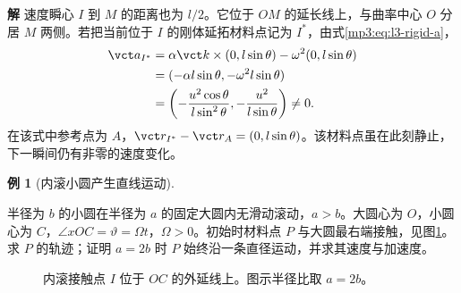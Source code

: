 \documentclass[11pt,openany,fontset=fandol]{ctexbook}
\theoremstyle{definition}\newtheorem{example}{例}[chapter]\newtheorem{exercise}{习题}[chapter]
\newcommand{\SolutionStart}{\par\medskip\ifdim\pagetotal>0pt\ifdim\dimexpr\pagegoal-\pagetotal\relax<3\baselineskip\newpage\fi\fi\noindent\textbf{解}\quad\ignorespaces}
\newenvironment{solution}{\SolutionStart}{\par\medskip}
\begin{document}
\begin{solution}
速度瞬心 $I$ 到 $M$ 的距离也为 $l/2$。它位于 $OM$ 的延长线上，与曲率中心 $O$ 分居 $M$ 两侧。若把当前位于 $I$ 的刚体延拓材料点记为 $I^\ast$，由式\eqref{mp3:eq:l3-rigid-a}，
\[
\begin{aligned}
\vct a_{I^\ast}
&=\alpha\vct k\times(0,l\sin\theta)-\omega^2(0,l\sin\theta)\\
&=(-\alpha l\sin\theta,-\omega^2l\sin\theta)\\
&=\left(-\frac{u^2\cos\theta}{l\sin^2\theta},
-\frac{u^2}{l\sin\theta}\right)\ne0.
\end{aligned}
\]
在该式中参考点为 $A$，$\vct r_{I^\ast}-\vct r_A=(0,l\sin\theta)$。该材料点虽在此刻静止，下一瞬间仍有非零的速度变化。

\end{solution}

\par\medskip\noindent\begin{minipage}{\textwidth}
\begin{example}[内滚小圆产生直线运动]\label{mp3:example:l3-e6}

半径为 $b$ 的小圆在半径为 $a$ 的固定大圆内无滑动滚动，$a>b$。大圆心为 $O$，小圆心为 $C$，$\angle xOC=\vartheta=\Omega t$，$\Omega>0$。初始时材料点 $P$ 与大圆最右端接触，见图\ref{mp3:fig:l3-e6-q}。求 $P$ 的轨迹；证明 $a=2b$ 时 $P$ 始终沿一条直径运动，并求其速度与加速度。

\end{example}
\begin{figure}[H]\centering
{}
\caption{内滚接触点 $I$ 位于 $OC$ 的外延线上。图示半径比取 $a=2b$。}\label{mp3:fig:l3-e6-q}
\end{figure}
\end{minipage}\par\medskip
\end{document}
